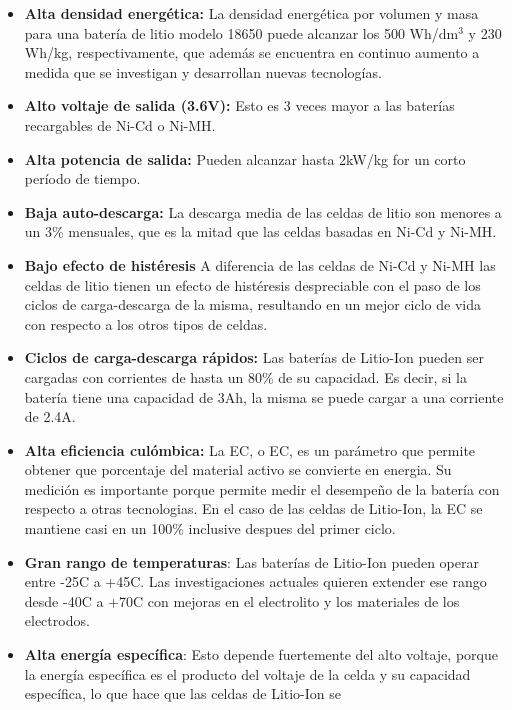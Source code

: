 \begin{itemize}
    \item \textbf{Alta densidad energética:} La densidad energética por
	volumen y masa para una batería de litio modelo 18650 puede alcanzar
	los 500 Wh/$\mathrm{dm^3}$ y 230 Wh/kg, respectivamente, que adem\'as
	se encuentra en continuo aumento a medida que se investigan y
	desarrollan nuevas tecnologías.
    \item \textbf{Alto voltaje de salida (3.6V):} Esto es 3 veces 
        mayor a las baterías recargables de Ni-Cd o Ni-MH.
    \item \textbf{Alta potencia de salida:} Pueden alcanzar hasta 2kW/kg for
	un corto per\'iodo de tiempo.
    \item \textbf{Baja auto-descarga:} La descarga media de las celdas de
	litio son menores a un 3\% mensuales, que es la mitad que las celdas
	basadas en Ni-Cd y Ni-MH.
    \item \textbf{Bajo efecto de histéresis} A diferencia de las celdas de
	Ni-Cd y Ni-MH las celdas de litio tienen un efecto de histéresis
	despreciable con el paso de los ciclos de carga-descarga de la
	misma, resultando en un mejor ciclo de vida con respecto a los otros
	tipos de celdas.
    \item \textbf{Ciclos de carga-descarga rápidos:} Las baterías de
	Litio-Ion pueden ser cargadas con corrientes de hasta un 80\% de su
	capacidad. Es decir, si la batería tiene una capacidad de 3Ah, la
	misma se puede cargar a una corriente de 2.4A.
    \item \textbf{Alta eficiencia cul\'ombica:} La \acrlong{EC}, o \acrshort{EC},
	es un par\'ametro que permite obtener que porcentaje del material
	activo se convierte en energia. Su medici\'on es importante porque 
	permite medir el desempeño de la bater\'ia con respecto a otras 
    tecnologias. En el caso de las celdas de Litio-Ion, la \acrlong{EC}
	se mantiene casi en un 100\% inclusive despues del primer ciclo.
    \item \textbf{Gran rango de temperaturas}: Las bater\'ias de Litio-Ion
	pueden operar entre -25\degree C a +45\degree C. Las
	investigaciones actuales quieren extender ese rango desde -40\degree C a 
    +70\degree C con mejoras en el electrolito y los materiales de los 
    electrodos.
    \item \textbf{Alta energ\'ia espec\'ifica}: Esto depende fuertemente del alto 
    voltaje, porque la energía específica es el producto del voltaje de la celda 
    y su capacidad específica, lo que hace que las celdas de Litio-Ion se 

\end{itemize}
